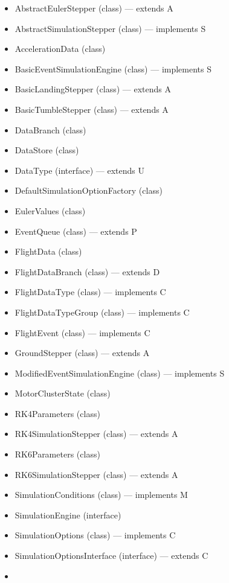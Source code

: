 \documentclass{amsdtx}
\begin{document}
\begin{itemize}
\begin{itemize}
\begin{itemize}
    \item
      AbstractEulerStepper (class) --- extends A
    \item
      AbstractSimulationStepper (class) --- implements S
    \item
      AccelerationData (class)
    \item
      BasicEventSimulationEngine (class) --- implements S
    \item
      BasicLandingStepper (class) --- extends A
    \item
      BasicTumbleStepper (class) --- extends A
    \item
      DataBranch (class)
    \item
      DataStore (class)
    \item
      DataType (interface) --- extends U
    \item
      DefaultSimulationOptionFactory (class)
    \item
      EulerValues (class)
    \item
      EventQueue (class) --- extends P
    \item
      FlightData (class)
    \item
      FlightDataBranch (class) --- extends D
    \item
      FlightDataType (class) --- implements C
    \item
      FlightDataTypeGroup (class) --- implements C
    \item
      FlightEvent (class) --- implements C
    \item
      GroundStepper (class) --- extends A
    \item
      ModifiedEventSimulationEngine (class) --- implements S
    \item
      MotorClusterState (class)
    \item
      RK4Parameters (class)
    \item
      RK4SimulationStepper (class) --- extends A
    \item
      RK6Parameters (class)
    \item
      RK6SimulationStepper (class) --- extends A
    \item
      SimulationConditions (class) --- implements M
    \item
      SimulationEngine (interface)
    \item
      SimulationOptions (class) --- implements C
    \item
      SimulationOptionsInterface (interface) --- extends C
    \item

\end{itemize}
\end{itemize}
\end{itemize}
\end{document}
